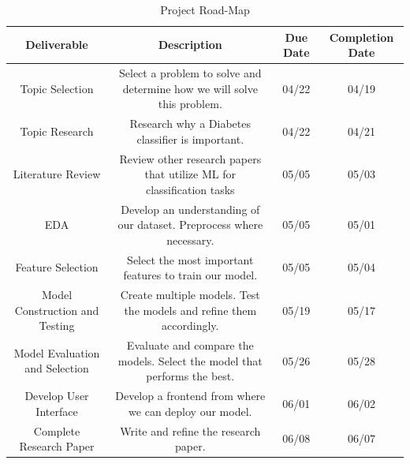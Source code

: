 \documentclass[conference]{IEEEtran}
\begin{document}
    \begin{table}[t]
        \centering
        \begin{tabular}{| c | c | c | c |}
            \toprule
            \textbf{Deliverable} & \textbf{Description} & \textbf{Due Date} & \textbf{Completion Date} \\ 
            \midrule
            Topic Selection & Select a problem to solve and determine how we will solve this problem. & 04/22 & 04/19 \\
            \midrule
            Topic Research & Research why a Diabetes classifier is important. & 04/22 & 04/21 \\
            \midrule
            Literature Review & Review other research papers that utilize ML for classification tasks & 05/05 & 05/03 \\
            \midrule
            EDA & Develop an understanding of our dataset. Preprocess where necessary. & 05/05 & 05/01 \\
            \midrule
            Feature Selection & Select the most important features to train our model. & 05/05 & 05/04 \\
            \midrule
            Model Construction and Testing & Create multiple models. Test the models and refine them accordingly. & 05/19 & 05/17 \\
            \midrule
            Model Evaluation and Selection & Evaluate and compare the models. Select the model that performs the best. & 05/26 & 05/28 \\
            \midrule
            Develop User Interface & Develop a frontend from where we can deploy our model. & 06/01 & 06/02 \\
            \midrule
            Complete Research Paper & Write and refine the research paper. & 06/08 & 06/07 \\
            \bottomrule
        \end{tabular}
        \vspace{0.2cm}
        \caption{Project Road-Map}
        \label{tab:roadmap}
    \end{table}
\end{document}
